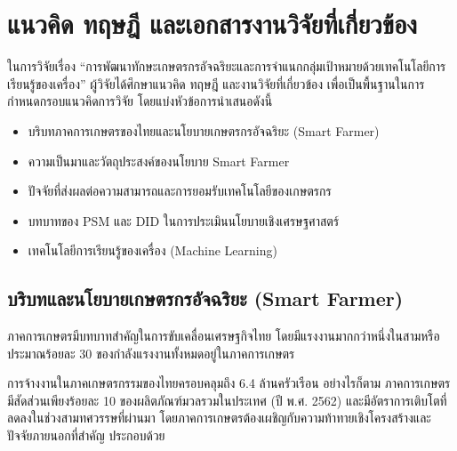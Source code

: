 \chapter{แนวคิด ทฤษฎี และเอกสารงานวิจัยที่เกี่ยวข้อง}

ในการวิจัยเรื่อง ``การพัฒนาทักษะเกษตรกรอัจฉริยะและการจำแนกกลุ่มเป้าหมายด้วยเทคโนโลยีการเรียนรู้ของเครื่อง'' ผู้วิจัยได้ศึกษาแนวคิด ทฤษฎี และงานวิจัยที่เกี่ยวข้อง เพื่อเป็นพื้นฐานในการกำหนดกรอบแนวคิดการวิจัย โดยแบ่งหัวข้อการนำเสนอดังนี้

\begin{itemize}
\item บริบทภาคการเกษตรของไทยและนโยบายเกษตรกรอัจฉริยะ (Smart Farmer)
\item ความเป็นมาและวัตถุประสงค์ของนโยบาย Smart Farmer
\item ปัจจัยที่ส่งผลต่อความสามารถและการยอมรับเทคโนโลยีของเกษตรกร
\item บทบาทของ PSM และ DID ในการประเมินนโยบายเชิงเศรษฐศาสตร์
\item เทคโนโลยีการเรียนรู้ของเครื่อง (Machine Learning)
\end{itemize}

\section{บริบทและนโยบายเกษตรกรอัจฉริยะ (Smart Farmer)}

ภาคการเกษตรมีบทบาทสำคัญในการขับเคลื่อนเศรษฐกิจไทย โดยมีแรงงานมากกว่าหนึ่งในสามหรือประมาณร้อยละ 30 ของกำลังแรงงานทั้งหมดอยู่ในภาคการเกษตร \cite{un2563}

การจ้างงานในภาคเกษตรกรรมของไทยครอบคลุมถึง 6.4 ล้านครัวเรือน อย่างไรก็ตาม ภาคการเกษตรมีสัดส่วนเพียงร้อยละ 10 ของผลิตภัณฑ์มวลรวมในประเทศ (ปี พ.ศ. 2562) และมีอัตราการเติบโตที่ลดลงในช่วงสามทศวรรษที่ผ่านมา โดยภาคการเกษตรต้องเผชิญกับความท้าทายเชิงโครงสร้างและปัจจัยภายนอกที่สำคัญ ประกอบด้วย

